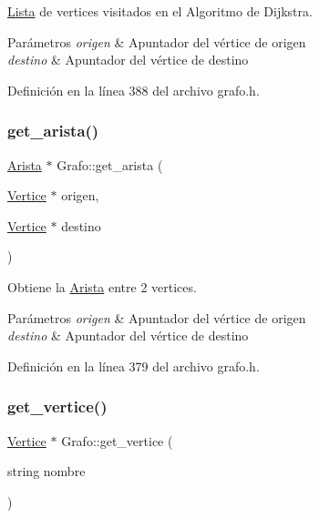 \hyperlink{classLista}{Lista} de vertices visitados en el \textquotesingle{}Algoritmo de Dijkstra\textquotesingle{}. 


\begin{DoxyParams}{Parámetros}
{\em origen} & Apuntador del vértice de origen \\
\hline
{\em destino} & Apuntador del vértice de destino \\
\hline
\end{DoxyParams}


Definición en la línea 388 del archivo grafo.\+h.

\mbox{\label{classGrafo_aed632e897451b00634e8f1d8088c12c8}} 
\subsubsection{\texorpdfstring{get\+\_\+arista()}{get\_arista()}}
{\footnotesize\ttfamily \hyperlink{classArista}{Arista} $\ast$ Grafo\+::get\+\_\+arista (\begin{DoxyParamCaption}\item[{\hyperlink{classVertice}{Vertice} $\ast$}]{origen,  }\item[{\hyperlink{classVertice}{Vertice} $\ast$}]{destino }\end{DoxyParamCaption})}



Obtiene la \hyperlink{classArista}{Arista} entre 2 vertices. 


\begin{DoxyParams}{Parámetros}
{\em origen} & Apuntador del vértice de origen \\
\hline
{\em destino} & Apuntador del vértice de destino \\
\hline
\end{DoxyParams}


Definición en la línea 379 del archivo grafo.\+h.

\mbox{\label{classGrafo_ac088cffbe30ed4c895ac831233251d99}} 
\subsubsection{\texorpdfstring{get\+\_\+vertice()}{get\_vertice()}}
{\footnotesize\ttfamily \hyperlink{classVertice}{Vertice} $\ast$ Grafo\+::get\+\_\+vertice (\begin{DoxyParamCaption}\item[{string}]{nombre }\end{DoxyParamCaption})}



